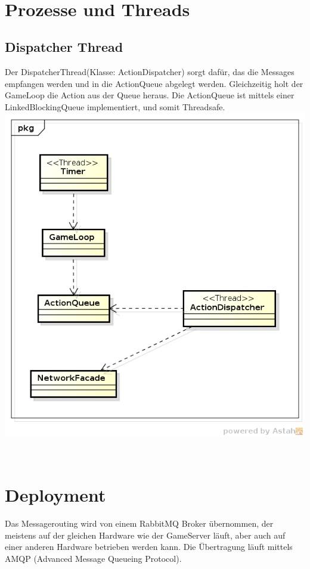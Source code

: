 \documentclass[11pt]{scrartcl}
\begin{document}
\newpage
 
\section{Prozesse und Threads}
\subsection{Dispatcher Thread}
Der DispatcherThread(Klasse: ActionDispatcher) sorgt dafür, das die Messages empfangen werden und in die ActionQueue abgelegt werden. Gleichzeitig holt der GameLoop die Action aus der Queue heraus. Die ActionQueue ist mittels einer LinkedBlockingQueue implementiert, und somit Threadsafe.\\

\includegraphics[scale=0.8]{ActionDispatcherProzess}



\newpage

 
\section{Deployment}
Das Messagerouting wird von einem RabbitMQ Broker übernommen, der meistens auf der gleichen Hardware wie der GameServer läuft, aber auch auf einer anderen Hardware betrieben werden kann. Die Übertragung läuft mittels AMQP (Advanced Message Queueing Protocol).\\
\end{document}
